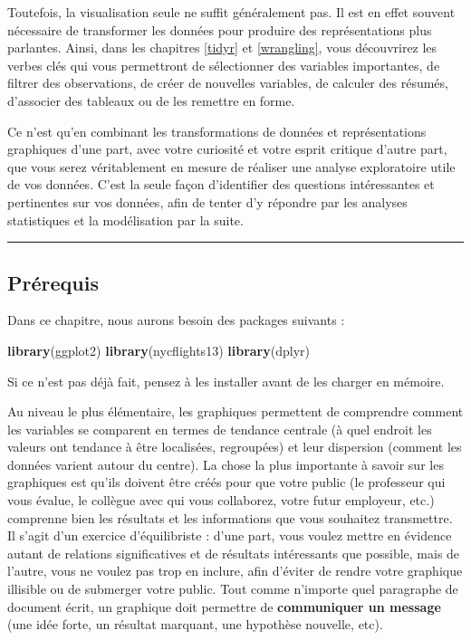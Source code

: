 \documentclass[a4paperpaper,]{article}
\newenvironment{Shaded}{\begin{snugshade}}{\end{snugshade}}
\newcommand{\KeywordTok}[1]{\textcolor[rgb]{0.12,0.11,0.11}{\textbf{#1}}}
\newcommand{\NormalTok}[1]{\textcolor[rgb]{0.12,0.11,0.11}{#1}}
\begin{document}
Toutefois, la visualisation seule ne suffit généralement pas. Il est en effet souvent nécessaire de transformer les données pour produire des représentations plus parlantes. Ainsi, dans les chapitres \ref{tidyr} et \ref{wrangling}, vous découvrirez les verbes clés qui vous permettront de sélectionner des variables importantes, de filtrer des observations, de créer de nouvelles variables, de calculer des résumés, d'associer des tableaux ou de les remettre en forme.

Ce n'est qu'en combinant les transformations de données et représentations graphiques d'une part, avec votre curiosité et votre esprit critique d'autre part, que vous serez véritablement en mesure de réaliser une analyse exploratoire utile de vos données. C'est la seule façon d'identifier des questions intéressantes et pertinentes sur vos données, afin de tenter d'y répondre par les analyses statistiques et la modélisation par la suite.

\begin{center}\rule{0.5\linewidth}{\linethickness}\end{center}

\hypertarget{prerequis}{%
\subsection{Prérequis}\label{prerequis}}

Dans ce chapitre, nous aurons besoin des packages suivants :

\begin{Shaded}
\begin{Highlighting}[]
\KeywordTok{library}\NormalTok{(ggplot2)}
\KeywordTok{library}\NormalTok{(nycflights13)}
\KeywordTok{library}\NormalTok{(dplyr)}
\end{Highlighting}
\end{Shaded}

Si ce n'est pas déjà fait, pensez à les installer avant de les charger en mémoire.

Au niveau le plus élémentaire, les graphiques permettent de comprendre comment les variables se comparent en termes de tendance centrale (à quel endroit les valeurs ont tendance à être localisées, regroupées) et leur dispersion (comment les données varient autour du centre). La chose la plus importante à savoir sur les graphiques est qu'ils doivent être créés pour que votre public (le professeur qui vous évalue, le collègue avec qui vous collaborez, votre futur employeur, etc.) comprenne bien les résultats et les informations que vous souhaitez transmettre. Il s'agit d'un exercice d'équilibriste : d'une part, vous voulez mettre en évidence autant de relations significatives et de résultats intéressants que possible, mais de l'autre, vous ne voulez pas trop en inclure, afin d'éviter de rendre votre graphique illisible ou de submerger votre public. Tout comme n'importe quel paragraphe de document écrit, un graphique doit permettre de \textbf{communiquer un message} (une idée forte, un résultat marquant, une hypothèse nouvelle, etc).
\end{document}
